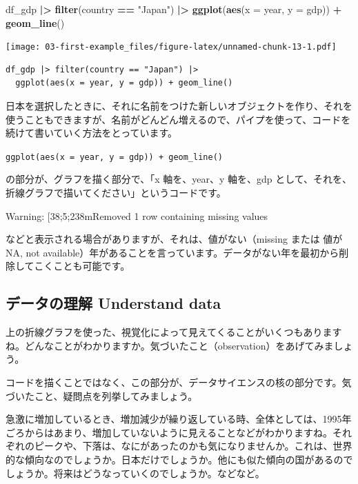 \documentclass[
  xelatex, ja=standard]{bxjsbook}
\newenvironment{Shaded}{\begin{snugshade}}{\end{snugshade}}
\newcommand{\AttributeTok}[1]{\textcolor[rgb]{0.13,0.29,0.53}{#1}}
\newcommand{\FunctionTok}[1]{\textcolor[rgb]{0.13,0.29,0.53}{\textbf{#1}}}
\newcommand{\NormalTok}[1]{#1}
\newcommand{\SpecialCharTok}[1]{\textcolor[rgb]{0.81,0.36,0.00}{\textbf{#1}}}
\newcommand{\StringTok}[1]{\textcolor[rgb]{0.31,0.60,0.02}{#1}}
\theoremstyle{definition}
\theoremstyle{definition}
\theoremstyle{definition}
\theoremstyle{definition}
\theoremstyle{remark}
\begin{document}
\begin{Shaded}
\begin{Highlighting}[]
\NormalTok{df\_gdp }\SpecialCharTok{|\textgreater{}} \FunctionTok{filter}\NormalTok{(country }\SpecialCharTok{==} \StringTok{"Japan"}\NormalTok{) }\SpecialCharTok{|\textgreater{}}
  \FunctionTok{ggplot}\NormalTok{(}\FunctionTok{aes}\NormalTok{(}\AttributeTok{x =}\NormalTok{ year, }\AttributeTok{y =}\NormalTok{ gdp)) }\SpecialCharTok{+} \FunctionTok{geom\_line}\NormalTok{()}
\end{Highlighting}
\end{Shaded}

\texttt{[image: 03-first-example\_files/figure-latex/unnamed-chunk-13-1.pdf]}

\begin{verbatim}
df_gdp |> filter(country == "Japan") |>
  ggplot(aes(x = year, y = gdp)) + geom_line()
\end{verbatim}

日本を選択したときに、それに名前をつけた新しいオブジェクトを作り、それを使うこともできますが、名前がどんどん増えるので、パイプを使って、コードを続けて書いていく方法をとっています。

\texttt{ggplot(aes(x\ =\ year,\ y\ =\ gdp))\ +\ geom\_line()}

の部分が、グラフを描く部分で、「x 軸を、year、y 軸を、gdp として、それを、折線グラフで描いてください」というコードです。

Warning: {[}38;5;238mRemoved 1 row containing missing values

などと表示される場合がありますが、それは、値がない（missing または 値が NA, not available）年があることを言っています。データがない年を最初から削除してこくことも可能です。

\hypertarget{ux30c7ux30fcux30bfux306eux7406ux89e3-understand-data}{%
\subsection{データの理解 Understand data}\label{ux30c7ux30fcux30bfux306eux7406ux89e3-understand-data}}

上の折線グラフを使った、視覚化によって見えてくることがいくつもありますね。どんなことがわかりますか。気づいたこと（observation）をあげてみましょう。

コードを描くことではなく、この部分が、データサイエンスの核の部分です。気づいたこと、疑問点を列挙してみましょう。

急激に増加しているとき、増加減少が繰り返している時、全体としては、1995年ごろからはあまり、増加していないように見えることなどがわかりますね。それぞれのピークや、下落は、なにがあったのかも気になりませんか。これは、世界的な傾向なのでしょうか。日本だけでしょうか。他にも似た傾向の国があるのでしょうか。将来はどうなっていくのでしょうか。などなど。
\end{document}
